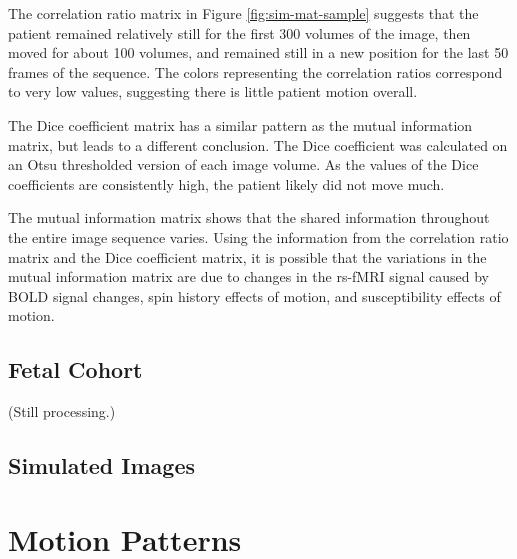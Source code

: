 The correlation ratio matrix in Figure \ref{fig:sim-mat-sample} suggests that the patient remained relatively still for the first 300 volumes of the image, then moved for about 100 volumes, and remained still in a new position for the last 50 frames of the sequence. The colors representing the correlation ratios correspond to very low values, suggesting there is little patient motion overall.

The Dice coefficient matrix has a similar pattern as the mutual information matrix, but leads to a different conclusion. The Dice coefficient was calculated on an Otsu thresholded version of each image volume. As the values of the Dice coefficients are consistently high, the patient likely did not move much. 

The mutual information matrix shows that the shared information throughout the entire image sequence varies. Using the information from the correlation ratio matrix and the Dice coefficient matrix, it is possible that the variations in the mutual information matrix are due to changes in the rs-fMRI signal caused by BOLD signal changes, spin history effects of motion, and susceptibility effects of motion.


\subsection{Fetal Cohort}

(Still processing.)

\subsection{Simulated Images}


\section{Motion Patterns}
